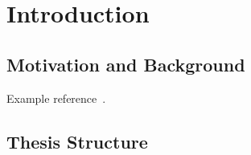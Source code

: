 \chapter{Introduction}
\section{Motivation and Background}
Example reference~\cite{AggarwalV88}.
\section{Thesis Structure}